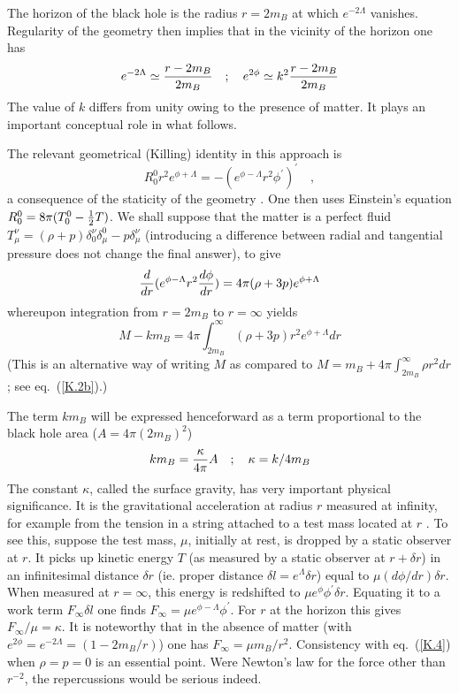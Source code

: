 \documentclass[12pt,oneside]{report}
\begin{document}
The  horizon of the  black hole is the radius   $r=2m_B$
at which $e^{-2 \Lambda}$ vanishes.
Regularity of the geometry then implies that in the vicinity
of the horizon  one has \begin{equation} e^{-2 \Lambda}
\simeq {r- 2 m_B \over 2 m_B} \quad ; \quad
e^{2 \phi} \simeq k^2 {r- 2 m_B \over 2 m_B}
\label{K.3}
\end{equation}
The value of $k$ differs from unity owing to the presence of
matter. It plays an important conceptual role in what
follows.

The relevant  geometrical (Killing) identity in this approach is
\begin{equation}
R^0_0 r^2 e^{\phi + \Lambda} = -\left ( e^{\phi - \Lambda} r^2 \phi^\prime
\right)^\prime
\quad ,\label{K.3b}
\end{equation}
a consequence of the staticity of the geometry . One then uses Einstein's
equation $R^0_0 = 8 \pi (T^0_0 - {1 \over 2} T)$.
We shall suppose that the matter is a perfect fluid
$T^\nu_\mu = (\rho + p) \delta^\nu_0 \delta^0_\mu - p \delta^\nu_\mu$
(introducing a difference between radial and tangential pressure does 
not change the final answer),
to give
\begin{equation}
{d \over dr} (e^{\phi-\Lambda} r^2 {d\phi \over dr}) = 4
\pi(\rho + 3 p )e^{\phi + \Lambda}\label{K.4}
\end{equation}
whereupon integration from $r=2m_B$ to $r=\infty$ yields
\begin{equation}
M - k m_B = 4 \pi \int _{2 m_B}^\infty (\rho + 3 p) r^2
e^{\phi + \Lambda} dr
\label{K.5}
\end{equation}
(This is an alternative way of writing $M$ as compared to $M
= m_B + 4 \pi \int_{2 m_B}^\infty\rho r^2 dr$; see eq.~(\ref{K.2b}).)

The  term $k m_B$ will be expressed henceforward as a term
proportional to the black hole area ($A=4 \pi (2 m_B)^2$)
\begin{equation}
k m_B = {\kappa \over 4 \pi } A\quad ; \quad \kappa = k/4 m_B
\label{K.6}
\end{equation}
The constant $\kappa$, called the surface gravity, has very
important physical significance. It is the gravitational
acceleration at radius $r$ measured at infinity, for example
from the tension in a string attached to a test mass located
at $r$ \cite{Pagepr}. To see this, suppose the test mass, $\mu$,
initially at rest, is dropped by a static observer at $r$. It
picks up kinetic energy $T$ (as measured by a static observer
at $r+\delta r$) in an infinitesimal distance $\delta r$ (ie.
proper distance $\delta l = e^{\Lambda} \delta r$) equal to
$\mu (d\phi / dr) \delta r$. When measured at $r=\infty$,
this energy is redshifted to $\mu e^{\phi}\phi^\prime
\delta r$. Equating it to a work term $F_\infty \delta l$
one finds $F_\infty = \mu e^{\phi-\Lambda} \phi^\prime$.
For $r$ at the horizon this gives $F_\infty / \mu =\kappa$.
It is noteworthy that in the absence of matter (with
$e^{2\phi}=e^{-2 \Lambda}=(1 - 2 m_B /r)$) one has
$F_\infty = \mu m_B / r^2$.
Consistency with eq.~(\ref{K.4}) when $\rho=p=0$ is an
essential point. Were Newton's law for the force other than
$r^{-2}$, the repercussions would be serious indeed.
\end{document}
